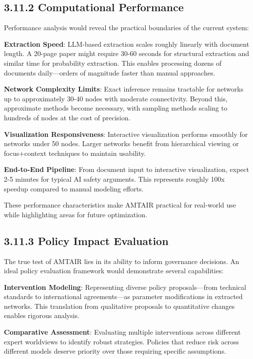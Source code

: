 \documentclass[
  11pt,
  letterpaper,
  openany]{book}
\begin{document}
\subsection{3.11.2 Computational
Performance}\label{sec-computational-performance}

Performance analysis would reveal the practical boundaries of the
current system:

\textbf{Extraction Speed}: LLM-based extraction scales roughly linearly
with document length. A 20-page paper might require 30-60 seconds for
structural extraction and similar time for probability extraction. This
enables processing dozens of documents daily---orders of magnitude
faster than manual approaches.

\textbf{Network Complexity Limits}: Exact inference remains tractable
for networks up to approximately 30-40 nodes with moderate connectivity.
Beyond this, approximate methods become necessary, with sampling methods
scaling to hundreds of nodes at the cost of precision.

\textbf{Visualization Responsiveness}: Interactive visualization
performs smoothly for networks under 50 nodes. Larger networks benefit
from hierarchical viewing or focus+context techniques to maintain
usability.

\textbf{End-to-End Pipeline}: From document input to interactive
visualization, expect 2-5 minutes for typical AI safety arguments. This
represents roughly 100x speedup compared to manual modeling efforts.

These performance characteristics make AMTAIR practical for real-world
use while highlighting areas for future optimization.

\subsection{3.11.3 Policy Impact Evaluation}\label{sec-policy-impact}

The true test of AMTAIR lies in its ability to inform governance
decisions. An ideal policy evaluation framework would demonstrate
several capabilities:

\textbf{Intervention Modeling}: Representing diverse policy
proposals---from technical standards to international agreements---as
parameter modifications in extracted networks. This translation from
qualitative proposals to quantitative changes enables rigorous analysis.

\textbf{Comparative Assessment}: Evaluating multiple interventions
across different expert worldviews to identify robust strategies.
Policies that reduce risk across different models deserve priority over
those requiring specific assumptions.
\end{document}
